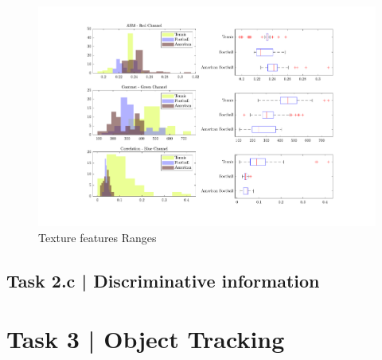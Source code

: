 \documentclass[conference]{IEEEtran}
\begin{document}
\begin{figure}[htbp]
    \centering
    \includegraphics[width=\columnwidth]{figures/ranges.pdf}
    \caption{Texture features Ranges\label{fig:tex_feats_ranges}}
\end{figure}


\subsection*{Task 2.c | Discriminative information}


\section*{Task 3 | Object Tracking}
\end{document}
